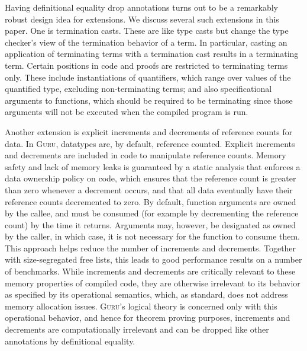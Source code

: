 \documentclass[9pt,natbib]{sigplanconf}
\newcommand{\guru}[0]{\textsc{Guru}}
\begin{document}
Having definitional equality drop annotations turns out to be a
remarkably robust design idea for extensions.  We discuss several such
extensions in this paper.  One is termination casts.  These are like
type casts but change the type checker's view of the termination
behavior of a term.  In particular, casting an application of
terminating terms with a termination cast results in a terminating
term.  Certain positions in code and proofs are restricted to
terminating terms only.  These include instantiations of quantifiers,
which range over values of the quantified type, excluding
non-terminating terms; and also specificational arguments to
functions, which should be required to be terminating since those
arguments will not be executed when the compiled program is run.

Another extension is explicit increments and decrements of reference
counts for data.  In \guru, datatypes are, by default, reference
counted.  Explicit increments and decrements are included in code to
manipulate reference counts.  Memory safety and lack of memory leaks
is guaranteed by a static analysis that enforces a data ownership
policy on code, which ensures that the reference count is greater than
zero whenever a decrement occurs, and that all data eventually have
their reference counts decremented to zero.  By default, function
arguments are owned by the callee, and must be consumed (for example
by decrementing the reference count) by the time it returns.
Arguments may, however, be designated as owned by the caller, in which
case, it is not necessary for the function to consume them.  This
approach helps reduce the number of increments and decrements.
Together with size-segregated free lists, this leads to good
performance results on a number of benchmarks.  While increments and
decrements are critically relevant to these memory properties of
compiled code, they are otherwise irrelevant to its behavior as
specified by its operational semantics, which, as standard, does not
address memory allocation issues.  \guru's logical theory is concerned
only with this operational behavior, and hence for theorem proving
purposes, increments and decrements are computationally irrelevant and
can be dropped like other annotations by definitional equality.
\end{document}

